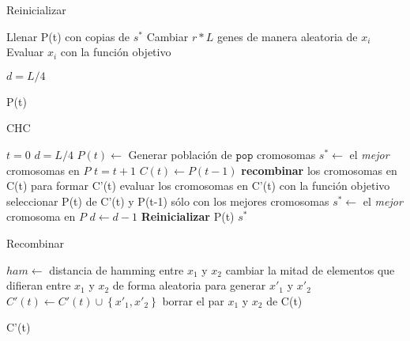 \begin{algorithm}
\caption{Reinicializar}
\label{Reinicializar}
\begin{algorithmic}


\State Llenar P(t) con copias de $s^*$
	\State Cambiar $r*L$ genes de manera aleatoria de $x_i$
	\State Evaluar $x_i$ con la función objetivo
\EndFor

\State $d=L/4$

\State \Return P(t)

\end{algorithmic}
\end{algorithm}

\begin{algorithm}
\caption{CHC}
\label{chc}
\begin{algorithmic}[1]


\State $t=0$
\State $d=L/4$
\State $P(t) \gets$ Generar población de $\texttt{pop}$ cromosomas
\State $s^* \gets $ el \emph{mejor} cromosomas en $P$
	\State $t=t+1$
	\State $C(t) \gets P(t-1)$
	\State \textbf{recombinar} los cromosomas en C(t) para formar C'(t)
	\State evaluar los cromosomas en C'(t) con la función objetivo
	\State seleccionar P(t) de C'(t) y P(t-1) sólo con los mejores cromosomas
		\State $s^* \gets$ el \emph{mejor} cromosoma en $P$
	\EndIf
		\State $d \gets d - 1$
	\EndIf
		\State \textbf{Reinicializar} P(t)
	\EndIf
\EndWhile
\State \Return $s^*$

\end{algorithmic}
\end{algorithm}

\begin{algorithm}
\caption{Recombinar}
\label{recombinar}
\begin{algorithmic}


	\State $ham \gets$ distancia de hamming entre $x_1$ y $x_2$
		\State cambiar la mitad de elementos que difieran entre $x_1$ y $x_2$ de forma aleatoria para generar $x'_1$ y $x'_2$
		\State $C'(t) \gets C'(t) \cup \left\{x'_1,x'_2\right\}$
	\Else
		\State borrar el par $x_1$ y $x_2$ de C(t)
	\EndIf
\EndFor

\State \Return C'(t)

\end{algorithmic}
\end{algorithm}



